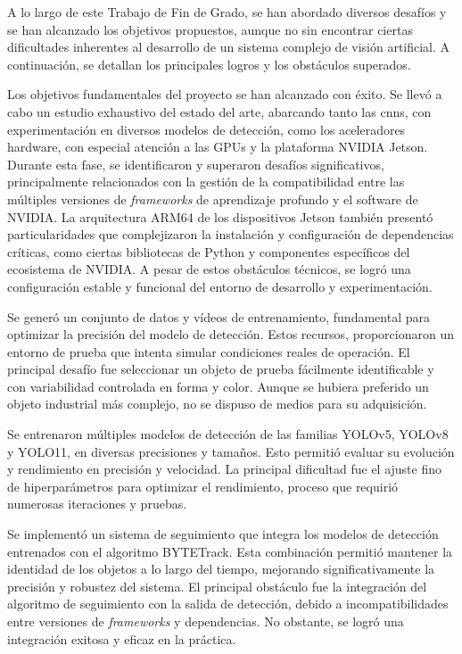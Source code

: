 \documentclass[11pt,spanish,listoffigures,listoftables]{tfgetsinf}
\begin{document}
A lo largo de este Trabajo de Fin de Grado, se han abordado diversos desafíos y se han alcanzado los objetivos propuestos, aunque no sin encontrar ciertas dificultades inherentes al desarrollo de un sistema complejo de visión artificial. A continuación, se detallan los principales logros y los obstáculos superados.

Los objetivos fundamentales del proyecto se han alcanzado con éxito. Se llevó a cabo un estudio exhaustivo del estado del arte, abarcando tanto las \glspl{cnn}, con experimentación en diversos modelos de detección, como los aceleradores hardware, con especial atención a las GPUs y la plataforma NVIDIA Jetson. Durante esta fase, se identificaron y superaron desafíos significativos, principalmente relacionados con la gestión de la compatibilidad entre las múltiples versiones de \textit{frameworks} de aprendizaje profundo y el software de NVIDIA. La arquitectura ARM64 de los dispositivos Jetson también presentó particularidades que complejizaron la instalación y configuración de dependencias críticas, como ciertas bibliotecas de Python y componentes específicos del ecosistema de NVIDIA. A pesar de estos obstáculos técnicos, se logró una configuración estable y funcional del entorno de desarrollo y experimentación.

Se generó un conjunto de datos y vídeos de entrenamiento, fundamental para optimizar la precisión del modelo de detección. Estos recursos, proporcionaron un entorno de prueba que intenta simular condiciones reales de operación. El principal desafío fue seleccionar un objeto de prueba fácilmente identificable y con variabilidad controlada en forma y color. Aunque se hubiera preferido un objeto industrial más complejo, no se dispuso de medios para su adquisición.

Se entrenaron múltiples modelos de detección de las familias YOLOv5, YOLOv8 y YOLO11, en diversas precisiones y tamaños. Esto permitió evaluar su evolución y rendimiento en precisión y velocidad. La principal dificultad fue el ajuste fino de hiperparámetros para optimizar el rendimiento, proceso que requirió numerosas iteraciones y pruebas.

Se implementó un sistema de seguimiento que integra los modelos de detección entrenados con el algoritmo BYTETrack. Esta combinación permitió mantener la identidad de los objetos a lo largo del tiempo, mejorando significativamente la precisión y robustez del sistema. El principal obstáculo fue la integración del algoritmo de seguimiento con la salida de detección, debido a incompatibilidades entre versiones de \textit{frameworks} y dependencias. No obstante, se logró una integración exitosa y eficaz en la práctica.
\end{document}
